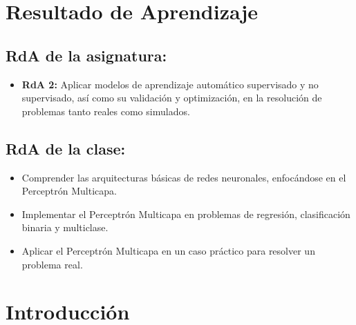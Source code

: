 \documentclass[a4,11pt]{aleph-notas}
\begin{document}
\encabezado


\section*{Resultado de Aprendizaje}

\subsection*{RdA de la asignatura:}
\begin{itemize}[leftmargin=*]
    \item \textbf{RdA 2:} 
    Aplicar modelos de aprendizaje automático supervisado y no supervisado, así como su validación y optimización, en la resolución de problemas tanto reales como simulados.
\end{itemize}

\subsection*{RdA de la clase:}
\begin{itemize}[leftmargin=*]
    \item Comprender las arquitecturas básicas de redes neuronales, enfocándose en el Perceptrón Multicapa.
    \item Implementar el Perceptrón Multicapa en problemas de regresión, clasificación binaria y multiclase.
    \item Aplicar el Perceptrón Multicapa en un caso práctico para resolver un problema real.
\end{itemize}

\section*{Introducción}
\end{document}
